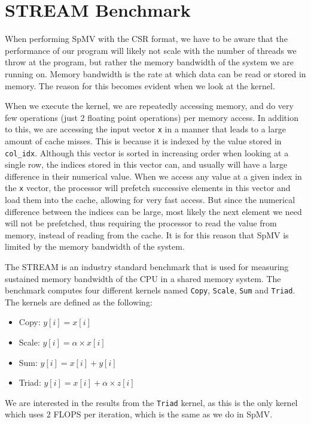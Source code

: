 \documentclass{article}
\begin{document}
    \section{STREAM Benchmark}
    When performing SpMV with the CSR format, we have to be aware that the performance of our program will likely not scale with the number of threads we throw at the program, but rather the memory bandwidth of the system we are running on. Memory bandwidth is the rate at which data can be read or stored in memory. The reason for this becomes evident when we look at the kernel.
    \medskip

    When we execute the kernel, we are repeatedly accessing memory, and do very few operations (just 2 floating point operations) per memory access. In addition to this, we are accessing the input vector \texttt{x} in a manner that leads to a large amount of cache misses. This is because it is indexed by the value stored in \texttt{col\_idx}. Although this vector is sorted in increasing order when looking at a single row, the indices stored in this vector can, and usually will have a large difference in their numerical value. When we access any value at a given index in the \texttt{x} vector, the processor will prefetch successive elements in this vector and load them into the cache, allowing for very fast access. But since the numerical difference between the indices can be large, most likely the next element we need will not be prefetched, thus requiring the processor to read the value from memory, instead of reading from the cache. It is for this reason that SpMV is limited by the memory bandwidth of the system.
    \medskip

    The STREAM is an industry standard benchmark that is used for measuring sustained memory bandwidth of the CPU in a shared memory system. The benchmark computes four different kernels named \texttt{Copy}, \texttt{Scale}, \texttt{Sum} and \texttt{Triad}. The kernels are defined as the following:

    \begin{itemize}
        \item Copy: \( y[i] = x[i] \)
        \item Scale: \( y[i] = \alpha \times x[i] \)
        \item Sum: \( y[i] = x[i] + y[i] \)
        \item Triad: \( y[i] = x[i] + \alpha \times z[i] \)
    \end{itemize}
        
    We are interested in the results from the \texttt{Triad} kernel, as this is the only kernel which uses 2 FLOPS per iteration, which is the same as we do in SpMV.
    \medskip
\end{document}
